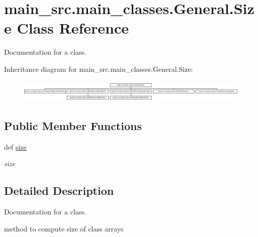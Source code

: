 \hypertarget{classmain__src_1_1main__classes_1_1General_1_1Size}{\section{main\-\_\-src.\-main\-\_\-classes.\-General.\-Size Class Reference}
\label{classmain__src_1_1main__classes_1_1General_1_1Size}
}


Documentation for a class.  


Inheritance diagram for main\-\_\-src.\-main\-\_\-classes.\-General.\-Size\-:\begin{figure}[H]
\begin{center}
\leavevmode
\includegraphics[height=1.066667cm]{classmain__src_1_1main__classes_1_1General_1_1Size}
\end{center}
\end{figure}
\subsection*{Public Member Functions}
\begin{DoxyCompactItemize}
\item 
def \hyperlink{classmain__src_1_1main__classes_1_1General_1_1Size_aafce4d10eeb0d3c3ebb2b88e83f73109}{size}
\begin{DoxyCompactList}\small\item\em size \end{DoxyCompactList}\end{DoxyCompactItemize}


\subsection{Detailed Description}
Documentation for a class. 

method to compute size of class arrays 

